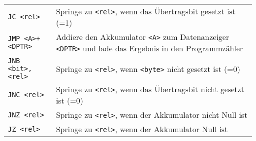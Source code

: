 \begin{longtable}[c]{@{}ll@{}}
\begin{minipage}[t]{0.25\columnwidth}\raggedright\strut
\texttt{JC <rel>}
\strut\end{minipage} & \begin{minipage}[t]{0.69\columnwidth}\raggedright\strut
Springe zu \texttt{<rel>}, wenn das Übertragsbit gesetzt ist (=1)
\strut\end{minipage}\tabularnewline
\begin{minipage}[t]{0.25\columnwidth}\raggedright\strut
\texttt{JMP <A>+<DPTR>}
\strut\end{minipage} & \begin{minipage}[t]{0.69\columnwidth}\raggedright\strut
Addiere den Akkumulator \texttt{<A>} zum Datenanzeiger \texttt{<DPTR>} und lade das Ergebnis
in den Programmzähler
\strut\end{minipage}\tabularnewline
\begin{minipage}[t]{0.25\columnwidth}\raggedright\strut
\texttt{JNB <bit>,<rel>}
\strut\end{minipage} & \begin{minipage}[t]{0.69\columnwidth}\raggedright\strut
Springe zu \texttt{<rel>}, wenn \texttt{<byte>} nicht gesetzt ist (=0)
\strut\end{minipage}\tabularnewline
\begin{minipage}[t]{0.25\columnwidth}\raggedright\strut
\texttt{JNC <rel>}
\strut\end{minipage} & \begin{minipage}[t]{0.69\columnwidth}\raggedright\strut
Springe zu \texttt{<rel>}, wenn das Übertragsbit nicht gesetzt ist (=0)
\strut\end{minipage}\tabularnewline
\begin{minipage}[t]{0.25\columnwidth}\raggedright\strut
\texttt{JNZ <rel>}
\strut\end{minipage} & \begin{minipage}[t]{0.69\columnwidth}\raggedright\strut
Springe zu \texttt{<rel>}, wenn der Akkumulator nicht Null ist
\strut\end{minipage}\tabularnewline
\begin{minipage}[t]{0.25\columnwidth}\raggedright\strut
\texttt{JZ <rel>}
\strut\end{minipage} & \begin{minipage}[t]{0.69\columnwidth}\raggedright\strut
Springe zu \texttt{<rel>}, wenn der Akkumulator Null ist

\end{minipage}
\end{longtable}
